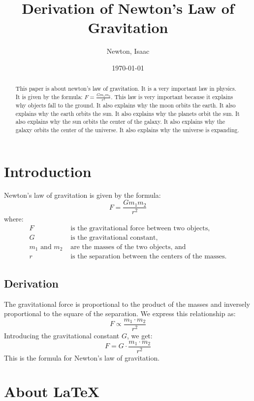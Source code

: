 \documentclass{article}
\begin{document}
\title{Derivation of Newton's Law of Gravitation}
\author{Newton, Isaac}
\date{\today}
\maketitle

\begin{abstract}
    This paper is about newton's law of gravitation. It is a very important law in physics. It is given by the formula: $F = \frac{G m_1 m_2}{r^2}$. This law is very important because it explains why objects fall to the ground. It also explains why the moon orbits the earth. It also explains why the earth orbits the sun. It also explains why the planets orbit the sun. It also explains why the sun orbits the center of the galaxy. It also explains why the galaxy orbits the center of the universe. It also explains why the universe is expanding.
\end{abstract}

\section{Introduction}
Newton's law of gravitation is given by the formula:
\[
    F = \frac{G m_1 m_2}{r^2}
\]
where:
\begin{align*}
    F                    & \text{ is the gravitational force between two objects,}      \\
    G                    & \text{ is the gravitational constant,}                       \\
    m_1 \text{ and } m_2 & \text{ are the masses of the two objects, and}               \\
    r                    & \text{ is the separation between the centers of the masses.}
\end{align*}

\subsection{Derivation}
The gravitational force is proportional to the product of the masses and inversely proportional to the square of the separation. We express this relationship as:
\[
    F \propto \frac{m_1 \cdot m_2}{r^2}
\]
Introducing the gravitational constant $G$, we get:
\[
    F = G \cdot \frac{m_1 \cdot m_2}{r^2}
\]
This is the formula for Newton's law of gravitation.

\newpage
\section*{\fontsize{24.88}{30}\selectfont \textbf{About \LaTeX}}
\end{document}
